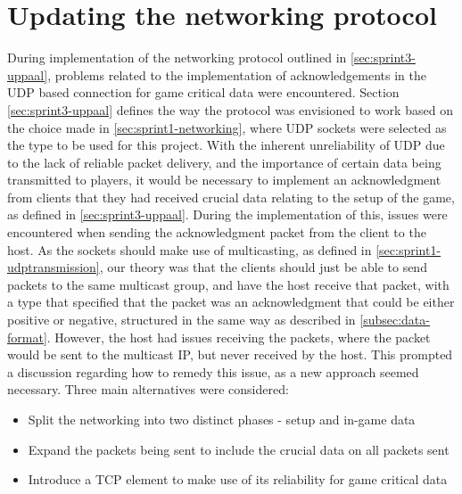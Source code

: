 \section{Updating the networking protocol}\label{sec:update-network-protocol}
During implementation of the networking protocol outlined in \autoref{sec:sprint3-uppaal}, problems related to the implementation of acknowledgements in the UDP based connection for game critical data were encountered.
Section \ref{sec:sprint3-uppaal} defines the way the protocol was envisioned to work based on the choice made in \autoref{sec:sprint1-networking}, where UDP sockets were selected as the type to be used for this project.
With the inherent unreliability of UDP due to the lack of reliable packet delivery, and the importance of certain data being transmitted to players, it would be necessary to implement an acknowledgment from clients that they had received crucial data relating to the setup of the game, as defined in \autoref{sec:sprint3-uppaal}.
During the implementation of this, issues were encountered when sending the acknowledgment packet from the client to the host.
As the sockets should make use of multicasting, as defined in \autoref{sec:sprint1-udptransmission}, our theory was that the clients should just be able to send packets to the same multicast group, and have the host receive that packet, with a type that specified that the packet was an acknowledgment that could be either positive or negative, structured in the same way as described in \autoref{subsec:data-format}.
However, the host had issues receiving the packets, where the packet would be sent to the multicast IP, but never received by the host.
This prompted a discussion regarding how to remedy this issue, as a new approach seemed necessary.
Three main alternatives were considered:
\begin{itemize}
    \item Split the networking into two distinct phases - setup and in-game data
    \item Expand the packets being sent to include the crucial data on all packets sent
    \item Introduce a TCP element to make use of its reliability for game critical data
\end{itemize}

